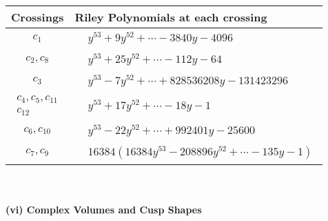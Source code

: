 \documentclass[1p]{elsarticle_modified}
\theoremstyle{definition}
\begin{document}
\begin{tabular}{m{50pt}|m{274pt}}
Crossings & \hspace{64pt}Riley Polynomials at each crossing \\
\hline $$\begin{aligned}c_{1}\end{aligned}$$&$\begin{aligned}
&y^{53}+9 y^{52}+\cdots-3840 y-4096
\end{aligned}$\\
\hline $$\begin{aligned}c_{2},c_{8}\end{aligned}$$&$\begin{aligned}
&y^{53}+25 y^{52}+\cdots-112 y-64
\end{aligned}$\\
\hline $$\begin{aligned}c_{3}\end{aligned}$$&$\begin{aligned}
&y^{53}-7 y^{52}+\cdots+828536208 y-131423296
\end{aligned}$\\
\hline $$\begin{aligned}c_{4},c_{5},c_{11}\\c_{12}\end{aligned}$$&$\begin{aligned}
&y^{53}+17 y^{52}+\cdots-18 y-1
\end{aligned}$\\
\hline $$\begin{aligned}c_{6},c_{10}\end{aligned}$$&$\begin{aligned}
&y^{53}-22 y^{52}+\cdots+992401 y-25600
\end{aligned}$\\
\hline $$\begin{aligned}c_{7},c_{9}\end{aligned}$$&$\begin{aligned}
&16384(16384 y^{53}-208896 y^{52}+\cdots-135 y-1)
\end{aligned}$\\
\hline
\end{tabular}\\~\\
\newpage\flushleft \textbf{(vi) Complex Volumes and Cusp Shapes}
\end{document}
